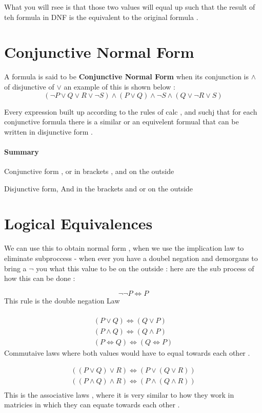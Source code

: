 \documentclass{article}
\theoremstyle{mytheoremstyle}
\theoremstyle{mytheoremstyle}
\theoremstyle{myproblemstyle}
\begin{document}
What you will rsee is that those two values will equal up such that the result of teh formula in DNF is the equivalent to the original formula .

\section{Conjunctive Normal Form}
A formula is said to be \textbf{Conjunctive Normal Form} when its conjunction is $ \land $ of disjunctive of $ \lor $ an example of this is shown below :
\[(\neg P \lor Q \lor R \lor \neg S) \land (P \lor Q) \land \neg S \land (Q \lor \neg R \lor S)\]

Every expression built up according to the rules of calc , and suchj that for each conjunctive formula there is a similar or an equivelent formual that can be written in disjunctive form .

\paragraph{Summary}
\item Conjunctive form , or in brackets , and on the outside
\item Disjunctive form,  And in the brackets and or on the outside
\newpage
\section{Logical Equivalences}
We can use this to obtain normal form , when we use the implication law to eliminate subproccess - when ever you have a doubel negation and demorgans to bring a $ \neg $ you what this value to be on the outside  : here are the sub process of how this can be done :


\[\neg\neg P \iff P \]
This rule is the double negation Law \\ \\

\[ \begin{array}{c}
    (P \lor Q) \iff (Q \lor P) \\
    (P \land Q) \iff (Q \land P) \\
    (P \iff Q) \iff (Q \iff P)
\end{array}\]
Commutaive laws where both values would have to equal towards each other  .


\[\begin{array}{c}
    ((P \lor Q) \lor R) \iff (P \lor (Q \lor R))\\
    ((P \land Q) \land R) \iff (P \land(Q \land R)) \\
\end{array}\]
This is the associative laws , where it is very similar to how they work in matricies in which they can equate towards each other . \\
\end{document}
